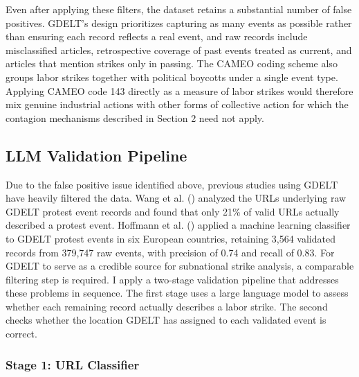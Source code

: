 \documentclass[
  11pt,
]{article}
\begin{document}
Even after applying these filters, the dataset retains a substantial
number of false positives. GDELT's design prioritizes capturing as many
events as possible rather than ensuring each record reflects a real
event, and raw records include misclassified articles, retrospective
coverage of past events treated as current, and articles that mention
strikes only in passing. The CAMEO coding scheme also groups labor
strikes together with political boycotts under a single event type.
Applying CAMEO code 143 directly as a measure of labor strikes would
therefore mix genuine industrial actions with other forms of collective
action for which the contagion mechanisms described in Section 2 need
not apply.

\subsection{LLM Validation Pipeline}\label{llm-validation-pipeline}

Due to the false positive issue identified above, previous studies using
GDELT have heavily filtered the data. Wang et al.
() analyzed the URLs underlying raw GDELT
protest event records and found that only 21\% of valid URLs actually
described a protest event. Hoffmann et al.
() applied a machine learning
classifier to GDELT protest events in six European countries, retaining
3,564 validated records from 379,747 raw events, with precision of 0.74
and recall of 0.83. For GDELT to serve as a credible source for
subnational strike analysis, a comparable filtering step is required. I
apply a two-stage validation pipeline that addresses these problems in
sequence. The first stage uses a large language model to assess whether
each remaining record actually describes a labor strike. The second
checks whether the location GDELT has assigned to each validated event
is correct.

\subsubsection{Stage 1: URL Classifier}\label{stage-1-url-classifier}
\end{document}
